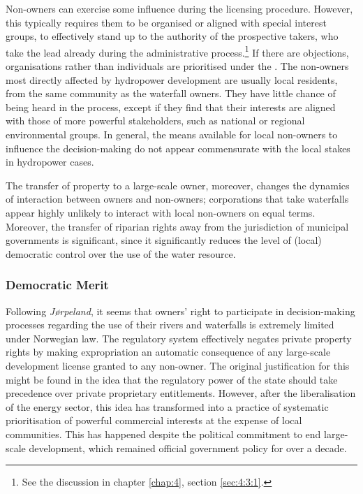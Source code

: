 Non-owners can exercise some influence during the licensing procedure. However, this typically requires them to be organised or aligned with special interest groups, to effectively stand up to the authority of the prospective takers, who take the lead already during the administrative process.\footnote{See the discussion in chapter \ref{chap:4}, section \ref{sec:4:3:1}.} If there are objections, organisations rather than individuals are prioritised under the \cite{wra17}. The non-owners most directly affected by hydropower development are usually local residents, from the same community as the waterfall owners. They have little chance of being heard in the process, except if they find that their interests are aligned with those of more powerful stakeholders, such as national or regional environmental groups. In general, the means available for local non-owners to influence the decision-making do not appear commensurate with the local stakes in hydropower cases.

The transfer of property to a large-scale owner, moreover, changes the dynamics of interaction between owners and non-owners; corporations that take waterfalls appear highly unlikely to interact with local non-owners on equal terms. Moreover, the transfer of riparian rights away from the jurisdiction of municipal governments is significant, since it significantly reduces the level of (local) democratic control over the use of the water resource. %

\subsubsection{Democratic Merit}\label{sec:5:7:9}

Following \emph{Jørpeland}, it seems that owners' right to participate in decision-making processes regarding the use of their rivers and waterfalls is extremely limited under Norwegian law. The regulatory system effectively negates private property rights by making expropriation an automatic consequence of any large-scale development license granted to any non-owner. The original justification for this might be found in the idea that the regulatory power of the state should take precedence over private proprietary entitlements. However, after the liberalisation of the energy sector, this idea has transformed into a practice of systematic prioritisation of powerful commercial interests at the expense of local communities. This has happened despite the political commitment to end large-scale development, which remained official government policy for over a decade.

